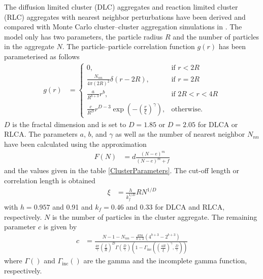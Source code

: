 The diffusion limited cluster (DLC) aggregates and reaction limited cluster (RLC) aggregates with nearest neighbor perturbations have been derived and compared with Monte Carlo cluster–cluster aggregation simulations in \cite{Lattuada2003}.  The model only has two parameters, the particle radius $R$ and the number of particles in the aggregate $N$.
The particle–particle correlation function $g(r)$ has been parameterised as follows
\begin{align}\label{eq:DLCARLCSinclNN_gr}
  g(r) &=
   \begin{cases}
     0, & \mbox{if } r<2R \\
     \frac{N_{nn}}{4\pi(2R)^2}\delta(r-2R), & \mbox{if } r=2R \\
     \frac{a}{R^{b+3}}r^b, & \mbox{if } 2R<r<4R \\
     \frac{c}{R^{D}}r^{D-3}\exp\left(-\left(\frac{r}{\xi}\right)^\gamma\right), & \mbox{otherwise}.
   \end{cases}
\end{align}
$D$ is the fractal dimension and is set to $D=1.85$ or $D=2.05$ for DLCA or RLCA. The parameters $a$, $b$, and $\gamma$ as well as the number of nearest neighbor $N_{nn}$ have been calculated using the approximation
\begin{align}
F(N) &= d\frac{(N-e)^m}{(N-e)^m+f}
\label{eq:F(i)}
\end{align}
and the values given in the table \ref{ClusterParameters}. The cut-off length or correlation length is obtained
\begin{align}\label{eq:xiMFinclNN}
  \xi &= \frac{h}{k_f^{1/D}}R N^{1/D}
\end{align}
with $h = 0.957$ and 0.91 and $k_f = 0.46$ and 0.33 for DLCA and RLCA, respectively. $N$ is the number of particles in the cluster aggregate. The remaining parameter $c$ is given by
\begin{align}\label{eq:MFinclNN_c}
  c & = \frac{N-1-N_{nn}-\frac{4\pi a}{b+3}\left(4^{b+3}-2^{b+3}\right)}{
              \frac{4\pi}{\gamma}\left(\frac{\xi}{R}\right)^D\Gamma\left(\frac{D}{\gamma}\right)
              \left(1-\Gamma_\mathrm{inc}\left(\left(\frac{4R}{\xi}\right)^\gamma,\frac{D}{\gamma}\right)\right)}
\end{align}
where $\Gamma()$ and $\Gamma_\mathrm{inc}()$ are the gamma and the incomplete gamma function, respectively.

